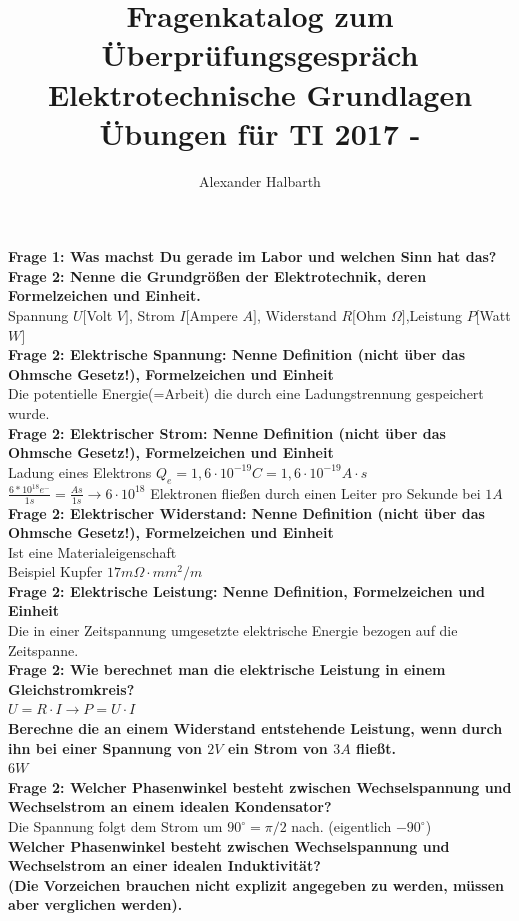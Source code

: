 \documentclass[11pt,a4paper]{scrartcl}
\author{Alexander Halbarth}
\title{\textbf{Fragenkatalog zum Überprüfungsgespräch Elektrotechnische Grundlagen Übungen für TI 2017 - \UE}}
\begin{document}
\maketitle
\textbf{Frage 1: Was machst Du gerade im Labor und welchen Sinn hat das?}\\
\textbf{Frage 2: Nenne die Grundgrößen der Elektrotechnik, deren Formelzeichen und Einheit.}\\
Spannung $U[$Volt $V]$, Strom $I[$Ampere $A]$, Widerstand $R[$Ohm $\Omega]$,Leistung $P[$Watt $W]$\\
\textbf{Frage 2: Elektrische Spannung: Nenne Definition (nicht über das Ohmsche Gesetz!), Formelzeichen und Einheit}\\
Die potentielle Energie(=Arbeit) die durch eine Ladungstrennung gespeichert wurde.\\
\textbf{Frage 2: Elektrischer Strom: Nenne Definition (nicht über das Ohmsche Gesetz!), Formelzeichen und Einheit}\\
Ladung eines Elektrons $Q_e=1,6 \cdot 10^{-19}C=1,6 \cdot 10^{-19}A\cdot s$\\
$\frac{6*10^{18}e^-}{1s}=\frac{As}{1s} \rightarrow 6 \cdot 10^{18}$ Elektronen fließen durch einen Leiter pro Sekunde bei $1A$\\
\textbf{Frage 2: Elektrischer Widerstand: Nenne Definition (nicht über das Ohmsche Gesetz!), Formelzeichen und Einheit}\\
Ist eine Materialeigenschaft\\
Beispiel Kupfer $17m\Omega \cdot mm^2/m$\\
\textbf{Frage 2: Elektrische Leistung: Nenne Definition, Formelzeichen und Einheit}\\
Die in einer Zeitspannung umgesetzte elektrische Energie bezogen auf die Zeitspanne.\\
\textbf{Frage 2: Wie berechnet man die elektrische Leistung in einem Gleichstromkreis?}\\
$U=R \cdot I \rightarrow P=U \cdot I$\\
\textbf{Berechne die an einem Widerstand entstehende Leistung, wenn durch ihn bei einer Spannung von $2V$ ein Strom von $3A$ fließt.}\\
$6W$\\
\textbf{Frage 2: Welcher Phasenwinkel besteht zwischen Wechselspannung und Wechselstrom an einem idealen Kondensator?}\\
Die Spannung folgt dem Strom um $90^\circ=\pi/2$ nach. (eigentlich $-90^\circ$)\\
\textbf{Welcher Phasenwinkel besteht zwischen Wechselspannung und Wechselstrom an einer idealen Induktivität?\\
(Die Vorzeichen brauchen nicht explizit angegeben zu werden, müssen aber verglichen werden).}\\
\end{document}
